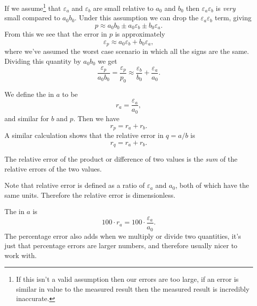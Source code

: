 \documentclass[fleqn]{LectureClass/LectureClass}
\begin{document}
    If we assume\footnote{If this isn't a valid assumption then our errors are too large, if an error is similar in value to the measured result then the measured result is incredibly inaccurate.} that \(\varepsilon_a\) and \(\varepsilon_b\) are small relative to \(a_0\) and \(b_0\) then \(\varepsilon_a \varepsilon_b\) is \emph{very} small compared to \(a_0 b_0\).
    Under this assumption we can drop the \(\varepsilon_a \varepsilon_b\) term, giving
    \begin{equation}
        p \approx a_0 b_0 \pm a_0\varepsilon_b \pm b_0\varepsilon_a.
    \end{equation}
    From this we see that the error in \(p\) is approximately
    \begin{equation}
        \varepsilon_p \approx a_0 \varepsilon_b + b_0 \varepsilon_a,
    \end{equation}
    where we've assumed the worst case scenario in which all the signs are the same.
    Dividing this quantity by \(a_0b_0\) we get
    \begin{equation}
        \frac{\varepsilon_p}{a_0b_0} = \frac{\varepsilon_p}{p_0} \approx \frac{\varepsilon_b}{b_0} + \frac{\varepsilon_a}{a_0}.
    \end{equation}
    
    We define the  in \(a\) to be
    \begin{equation}
        r_a = \frac{\varepsilon_a}{a_0},
    \end{equation}
    and similar for \(b\) and \(p\).
    Then we have
    \begin{equation}
        r_p = r_a + r_b.
    \end{equation}
    A similar calculation shows that the relative error in \(q = a/b\) is
    \begin{equation}
        r_q = r_a + r_b.
    \end{equation}
    
    \begin{prp}{}{}
        The relative error of the product or difference of two values is the \emph{sum} of the relative errors of the two values.
    \end{prp}
    
    Note that relative error is defined as a ratio of \(\varepsilon_a\) and \(a_0\), both of which have the same units.
    Therefore the relative error is dimensionless.
    
    The  in \(a\) is
    \begin{equation}
        100 \cdot r_a = 100 \cdot \frac{\varepsilon_a}{a_0}.
    \end{equation}
    The percentage error also adds when we multiply or divide two quantities, it's just that percentage errors are larger numbers, and therefore usually nicer to work with.
    
\end{document}
